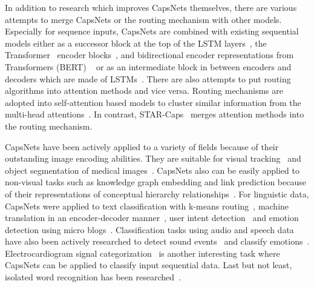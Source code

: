 \documentclass[review]{elsarticle}
\begin{document}
In addition to research which improves CapsNets themselves, there are various attempts to merge CapsNets or the routing mechanism with other models.
Especially for sequence inputs, CapsNets are combined with existing sequential models either as a successor block at the top of the LSTM layers~\citep{zhang-etal-2018-attention, DBLP:conf/icann/HePLHZ19}, the Transformer~\citep{DBLP:conf/nips/VaswaniSPUJGKP17} encoder blocks~\citep{liu-etal-2019-transformer}, and bidirectional encoder representations from Transformers (BERT)
~\citep{DBLP:conf/naacl/DevlinCLT19, DBLP:journals/jbi/SunYWZLW20} or as an intermediate block in between encoders and decoders which are made of LSTMs~\citep{wang-2019-towards}.
There are also attempts to put routing algorithms into attention methods and vice versa.
Routing mechanisms are adopted into self-attention based models to cluster similar information from the multi-head attentions~\citep{DBLP:conf/nlpcc/GuF19}.
In contrast, STAR-Caps~\citep{DBLP:conf/nips/AhmedT19} merges attention methods into the routing mechanism.

CapsNets have been actively applied to a variety of fields because of their outstanding image encoding abilities.
They are suitable for visual tracking~\citep{DBLP:journals/corr/abs-1902-10054} and object segmentation of medical images~\citep{DBLP:journals/corr/abs-1804-04241}.
CapsNets also can be easily applied to non-visual tasks such as knowledge graph embedding and link prediction because of their representations of conceptual hierarchy relationships~\citep{DBLP:conf/naacl/NguyenVNNP19, DBLP:conf/iclr/XinyiC19}.
For linguistic data, CapsNets were applied to text classification with k-means routing~\citep{DBLP:journals/corr/abs-1810-09177}, machine translation in an encoder-decoder manner~\citep{wang-2019-towards}, user intent detection~\citep{DBLP:conf/emnlp/XiaZYCY18, DBLP:conf/acl/ZhangLDFY19} and emotion detection using micro blogs~\citep{DBLP:journals/nca/ZhongLLCLDWZ20}.
Classification tasks using audio and speech data~\citep{DBLP:journals/corr/abs-1902-05069} have also been actively researched to detect sound events~\citep{DBLP:conf/eusipco/Iqbal0KW18, DBLP:journals/jstsp/VesperiniGPS19} and classify emotions~\citep{DBLP:conf/icassp/WuLCLYDMHWLM19}.
Electrocardiogram signal categorization~\citep{Jayasekara2019TimeCapsCT} is another interesting task where CapsNets can be applied to classify input sequential data.
Last but not least, isolated word recognition has been researched~\citep{DBLP:conf/interspeech/BaeK18, xiongyan2018master}.
\end{document}
